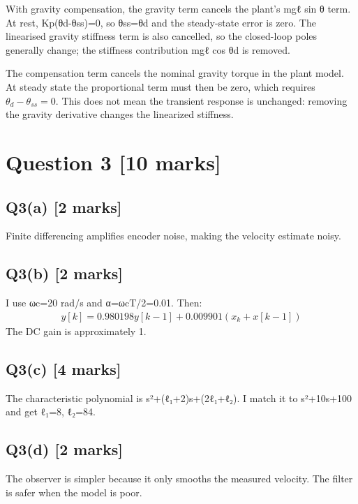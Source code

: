 \documentclass[11pt,a4paper]{article}
\begin{document}
With gravity compensation, the gravity term cancels the plant's mgℓ sin θ term.
At rest, Kp(θd-θss)=0, so θss=θd and the steady-state error is zero.
The linearised gravity stiffness term is also cancelled, so the closed-loop poles generally change; the stiffness contribution mgℓ cos θd is removed.\par\smallskip The compensation term cancels the nominal gravity torque in the plant model. At steady state the proportional term must then be zero, which requires $\theta_d-\theta_{ss}=0$. This does not mean the transient response is unchanged: removing the gravity derivative changes the linearized stiffness.

\section*{Question 3 \hfill [10 marks]}
\subsection*{Q3(a) \hfill [2 marks]}

Finite differencing amplifies encoder noise, making the velocity estimate noisy.

\subsection*{Q3(b) \hfill [2 marks]}

I use ωc=20 rad/s and α=ωcT/2=0.01.
Then:\[\begin{aligned}y[k] = 0.980198y[k-1] + 0.009901(x_k+x[k-1])\end{aligned}\]
The DC gain is approximately 1.

\subsection*{Q3(c) \hfill [4 marks]}

The characteristic polynomial is s²+(ℓ₁+2)s+(2ℓ₁+ℓ₂).
I match it to s²+10s+100 and get ℓ₁=8, ℓ₂=84.

\subsection*{Q3(d) \hfill [2 marks]}

The observer is simpler because it only smooths the measured velocity.
The filter is safer when the model is poor.
\end{document}

